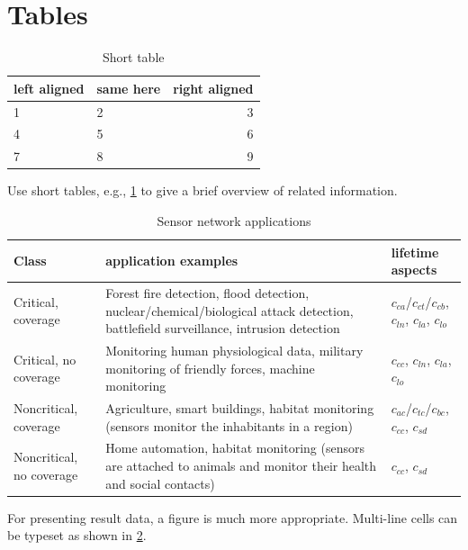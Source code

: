 \documentclass[]{ccs-thesis}
\begin{document}
{\clearpage
\section{Tables}

\begin{table}
	\centering
	\begin{tabular}{llr}
		\toprule
		left aligned & same here & right aligned \\
		\midrule
		1 & 2 & 3 \\
		4 & 5 & 6 \\
		7 & 8 & 9 \\
		\bottomrule
	\end{tabular}
	\caption{Short table}
	\label{tab:shorttable}
\end{table}

Use short tables, e.g., \cref{tab:shorttable} to give a brief overview of related information.

\begin{table}
	\centering
	\begin{tabular}{>{\raggedright}p{1.7cm}p{5.4cm}p{3.4cm}}
		\toprule
		Class & application examples & lifetime aspects \\
		\midrule
		Critical, coverage &
				Forest fire detection, flood detection, nuclear/chemical/biological attack detection, battlefield surveillance, intrusion detection &
				$c_{ca}$/$c_{ct}$/$c_{cb}$, $c_{ln}$, $c_{la}$, $c_{lo}$\\
		Critical, no coverage &
				Monitoring human physiological data, military monitoring of friendly forces, machine monitoring &
				$c_{cc}$, $c_{ln}$, $c_{la}$, $c_{lo}$ \\
		Noncritical, coverage &
				Agriculture, smart buildings, habitat monitoring (sensors monitor the inhabitants in a region) &
				$c_{ac}$/$c_{tc}$/$c_{bc}$, $c_{cc}$, $c_{sd}$ \\
		Noncritical, no coverage &
				Home automation, habitat monitoring (sensors are attached to animals and monitor their health and social contacts) &
				$c_{cc}$, $c_{sd}$ \\
		\bottomrule
	\end{tabular}
	\caption{Sensor network applications}
	\label{tab:SensorNetworkApplications}
\end{table}

For presenting result data, a figure is much more appropriate.
Multi-line cells can be typeset as shown in \cref{tab:SensorNetworkApplications}.

\clearpage
}
\end{document}
